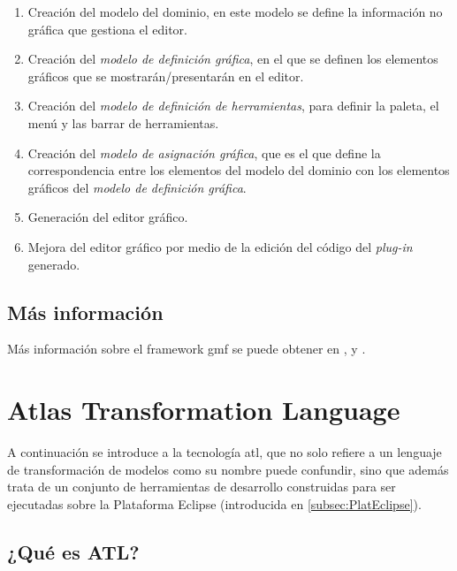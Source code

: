 \documentclass[a4paper,12pt,twoside,spanish,openright]{book}
\begin{document}
\begin{enumerate}


\item Creación del modelo del dominio, en este modelo se define la información no gráfica  que gestiona el editor.

\item Creación del \textit{modelo de definición gráfica}, en el que se definen los elementos gráficos que se mostrarán/presentarán en el editor.

\item Creación del \textit{modelo de definición de herramientas}, para definir la paleta, el menú y las barrar de herramientas.

\item Creación del \textit{modelo de asignación gráfica}, que es el que define la correspondencia entre los elementos del modelo del dominio con los elementos gráficos del \textit{modelo de definición gráfica}.

\item Generación del editor gráfico.

\item Mejora del editor gráfico por medio de la edición del código del \textit{plug-in} generado.

\end{enumerate}


\subsection{Más información}

Más información sobre el framework \gls{gmf} se puede obtener en \cite{GMP}, \cite{IntroGMFRuntime} y \cite{GMFTutorial}.


\section{Atlas Transformation Language}

A continuación se introduce a la tecnología \gls{atl}, que no solo refiere a un lenguaje de transformación de modelos como su nombre puede confundir, sino que además trata de un conjunto de herramientas de desarrollo construidas para ser ejecutadas sobre la Plataforma \textsf{Eclipse} (introducida en \ref{subsec:PlatEclipse}).


\subsection{¿Qué es ATL?}
\end{document}
